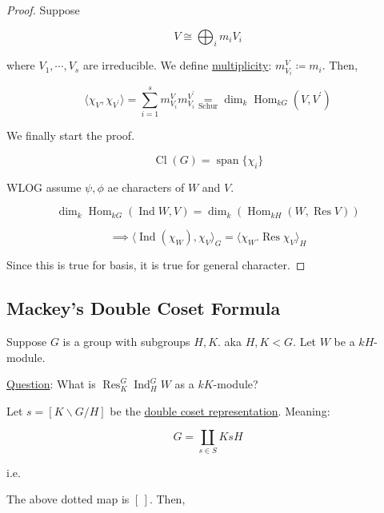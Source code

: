 \documentclass{article}
\theoremstyle{definition}
\begin{document}
\begin{proof}
    Suppose 

    \[
        V \cong \bigoplus_{i} m_i V_i
    \]

    where \(V_1, \cdots , V_s\) are irreducible. We define \underline{multiplicity}: \(m^V_{V_i} \coloneqq m_i\). Then,

    \[
        \langle \chi_V, \chi_{V^{\prime}} \rangle = \sum_{i=1}^s m^V_{V_i} m^{V^{\prime}}_{V_i} \underset{\text{Schur}}{=} \dim_k \operatorname{Hom}_{kG}(V,V^{\prime}) 
    \]

    We finally start the proof.

    \[
        \operatorname{Cl}(G) = \operatorname{span} \{ \chi_i \}
    \]

    WLOG assume \(\psi , \phi\) ae characters of \(W\) and \(V\).

    \[
        \dim_k \operatorname{Hom}_{kG} (\operatorname{Ind} W, V)=\dim_k (\operatorname{Hom}_{kH}(W, \operatorname{R es} V))
    \]

    \[
        \implies \langle \operatorname{Ind}(\chi_W), \chi_V  \rangle _G = \langle \chi_W. \operatorname{R es} \chi_V  \rangle _H
    \]

    Since this is true for basis, it is true for general character.

\end{proof}

\subsection*{Mackey's Double Coset Formula}

Suppose \(G\) is a group with subgroups \(H,K\). aka \(H,K < G\). Let \(W\) be a \(kH\)-module.

\underline{Question}: What is \(\operatorname{R es}_K^G \operatorname{Ind}_H^G W\) as a \(kK\)-module? 

Let \(s = [K \backslash G / H]\) be the \underline{double coset representation}. Meaning:

\[
    G = \coprod_{s\in S} KsH
\]

i.e.

\begin{center}
\end{center}

The above dotted map is \([\,]\). Then,
\end{document}
